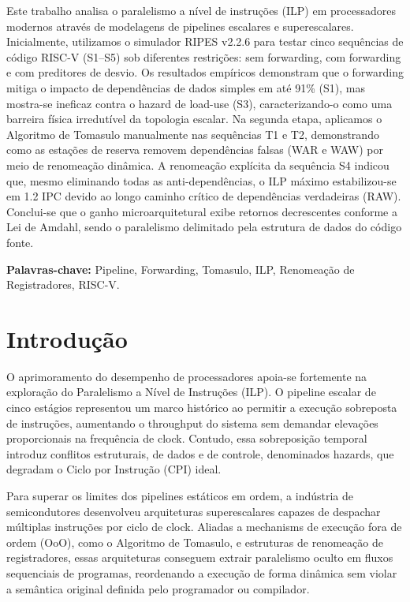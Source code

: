 \documentclass[12pt,a4paper]{article}
\begin{document}
Este trabalho analisa o paralelismo a nível de instruções (ILP) em processadores modernos através de modelagens de pipelines escalares e superescalares. Inicialmente, utilizamos o simulador RIPES v2.2.6 para testar cinco sequências de código RISC-V (S1--S5) sob diferentes restrições: sem forwarding, com forwarding e com preditores de desvio. Os resultados empíricos demonstram que o forwarding mitiga o impacto de dependências de dados simples em até 91\% (S1), mas mostra-se ineficaz contra o hazard de load-use (S3), caracterizando-o como uma barreira física irredutível da topologia escalar. Na segunda etapa, aplicamos o Algoritmo de Tomasulo manualmente nas sequências T1 e T2, demonstrando como as estações de reserva removem dependências falsas (WAR e WAW) por meio de renomeação dinâmica. A renomeação explícita da sequência S4 indicou que, mesmo eliminando todas as anti-dependências, o ILP máximo estabilizou-se em 1.2 IPC devido ao longo caminho crítico de dependências verdadeiras (RAW). Conclui-se que o ganho microarquitetural exibe retornos decrescentes conforme a Lei de Amdahl, sendo o paralelismo delimitado pela estrutura de dados do código fonte.

\textbf{Palavras-chave:} Pipeline, Forwarding, Tomasulo, ILP, Renomeação de Registradores, RISC-V.
\newpage

\section{Introdução}

O aprimoramento do desempenho de processadores apoia-se fortemente na exploração do Paralelismo a Nível de Instruções (ILP). O pipeline escalar de cinco estágios representou um marco histórico ao permitir a execução sobreposta de instruções, aumentando o throughput do sistema sem demandar elevações proporcionais na frequência de clock. Contudo, essa sobreposição temporal introduz conflitos estruturais, de dados e de controle, denominados hazards, que degradam o Ciclo por Instrução (CPI) ideal.

Para superar os limites dos pipelines estáticos em ordem, a indústria de semicondutores desenvolveu arquiteturas superescalares capazes de despachar múltiplas instruções por ciclo de clock. Aliadas a mechanisms de execução fora de ordem (OoO), como o Algoritmo de Tomasulo, e estruturas de renomeação de registradores, essas arquiteturas conseguem extrair paralelismo oculto em fluxos sequenciais de programas, reordenando a execução de forma dinâmica sem violar a semântica original definida pelo programador ou compilador.
\end{document}

